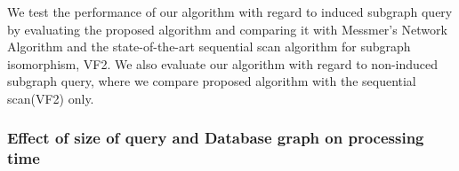 
We test the performance of our algorithm with regard to induced subgraph query by evaluating the proposed algorithm and comparing it with Messmer's Network Algorithm and the state-of-the-art sequential scan algorithm for subgraph isomorphism, VF2\cite{cordella2001_vf2}.
We also evaluate our algorithm with regard to non-induced subgraph query, where we compare proposed algorithm with the sequential scan(VF2) only.


\subsubsection{Effect of size of query and Database graph on processing time}


